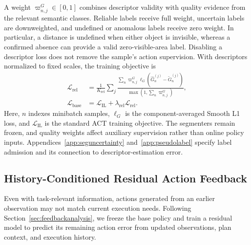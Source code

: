 A weight $\varpi_{n,j}^{G}\in[0,1]$ combines descriptor validity with quality evidence from the relevant semantic classes.
Reliable labels receive full weight, uncertain labels are downweighted, and undefined or anomalous labels receive zero weight.
In particular, a distance is undefined when either object is invisible, whereas a confirmed absence can provide a valid zero-visible-area label.
Disabling a descriptor loss does not remove the sample's action supervision.
With descriptors normalized to fixed scales, the training objective is
\begin{align}
 \mathcal L_{\mathrm{rel}}
 &=\frac{1}{K_{\mathrm{rel}}}\sum_j
   \frac{\sum_n\varpi_{n,j}^{G}
      \ell_G(\widehat G_n^{(j)}-\widetilde G_n^{(j)})}
        {\max(1,\sum_n\varpi_{n,j}^{G})},\nonumber\\
 \mathcal L_{\mathrm{base}}
 &=\mathcal L_{\mathrm{IL}}
   +\lambda_{\mathrm{rel}}\mathcal L_{\mathrm{rel}}.
 \label{eq:methodbaseloss}
\end{align}
Here, $n$ indexes minibatch samples, $\ell_G$ is the component-averaged Smooth L1 loss, and $\mathcal L_{\mathrm{IL}}$ is the standard ACT training objective.
The segmenters remain frozen, and quality weights affect auxiliary supervision rather than online policy inputs.
Appendices~\ref{app:seguncertainty} and~\ref{app:pseudolabel} specify label admission and its connection to descriptor-estimation error.

\subsection{History-Conditioned Residual Action Feedback}
\label{sec:methodfeedback}
Even with task-relevant information, actions generated from an earlier observation may not match current execution needs.
Following Section~\ref{sec:feedbackanalysis}, we freeze the base policy and train a residual model to predict its remaining action error from updated observations, plan context, and execution history.


